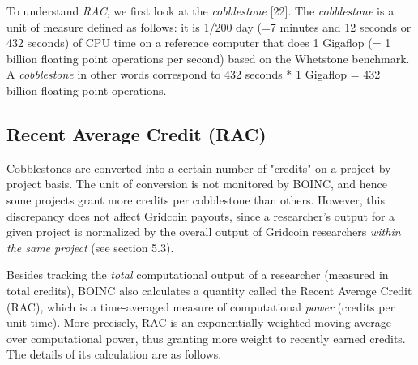 To understand \textit{RAC}, we first look at the \textit{cobblestone} [22]. The \textit{cobblestone} is a unit of measure defined as follows: it is 1/200 day (=7 minutes and 12 seconds or 432 seconds) of CPU time on a reference computer that does 1 Gigaflop (= 1 billion floating point operations per second) based on the Whetstone benchmark. A \textit{cobblestone} in other words correspond to 432 seconds * 1 Gigaflop = 432 billion floating point operations.\\


\subsection{Recent Average Credit (RAC)}

Cobblestones are converted into a certain number of "credits" on a project-by-project basis. The unit of conversion is not monitored by BOINC, and hence some projects grant more credits per cobblestone than others. However, this discrepancy does not affect Gridcoin payouts, since a researcher's output for a given project is normalized by the overall output of Gridcoin researchers \textit{within the same project} (see section 5.3).  

Besides tracking the \textit{total} computational output of a researcher (measured in total credits), BOINC also calculates a quantity called the Recent Average Credit (RAC), which is a time-averaged measure of computational \textit{power} (credits per unit time). More precisely, RAC is an exponentially weighted moving average over computational power, thus granting more weight to recently earned credits. The details of its calculation are as follows.


